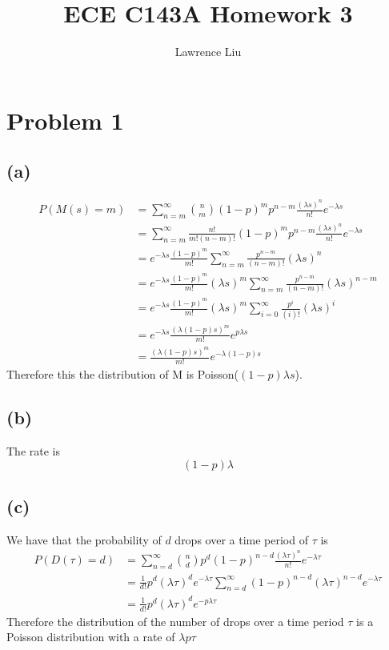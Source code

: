 \documentclass[12pt]{article}
\title{ECE C143A Homework 3}
\author{Lawrence Liu}
\begin{document}
\maketitle
\section*{Problem 1}
\subsection*{(a)}
\begin{align*}
    P(M(s)=m)&=\sum_{n=m}^{\infty}\binom{n}{m}(1-p)^mp^{n-m}\frac{(\lambda s)^n}{n!}e^{-\lambda s}\\
            &=\sum_{n=m}^{\infty}\frac{n!}{m!(n-m)!}(1-p)^mp^{n-m}\frac{(\lambda s)^n}{n!}e^{-\lambda s}\\
            &=e^{-\lambda s}\frac{(1-p)^m}{m!}\sum_{n=m}^{\infty}\frac{p^{n-m}}{(n-m)!}(\lambda s)^n\\
            &=e^{-\lambda s}\frac{(1-p)^m}{m!}(\lambda s)^{m}\sum_{n=m}^{\infty}\frac{p^{n-m}}{(n-m)!}(\lambda s)^{n-m}\\
            &=e^{-\lambda s}\frac{(1-p)^m}{m!}(\lambda s)^{m}\sum_{i=0}^{\infty}\frac{p^{i}}{(i)!}(\lambda s)^{i}\\
            &=e^{-\lambda s}\frac{(\lambda(1-p)s)^m}{m!}e^{p\lambda s}\\
            &=\frac{(\lambda(1-p)s)^m}{m!}e^{-\lambda(1-p)s}
\end{align*}
Therefore this the distribution of M is Poisson($(1-p)\lambda s$).
\subsection*{(b)}
The rate is 
$$(1-p)\lambda$$
\subsection*{(c)}
We have that the probability of $d$ drops over a time period of $\tau$ is 
\begin{align*}
    P(D(\tau)=d)&=\sum_{n=d}^{\infty}\binom{n}{d}p^d(1-p)^{n-d}\frac{(\lambda\tau)^n}{n!}e^{-\lambda \tau}\\
    &=\frac{1}{d!}p^d(\lambda\tau)^de^{-\lambda \tau}\sum_{n=d}^{\infty}(1-p)^{n-d}(\lambda\tau)^{n-d}e^{-\lambda\tau}\\
    &=\frac{1}{d!}p^d(\lambda\tau)^de^{-p\lambda\tau}
\end{align*}
Therefore the distribution of the number of drops over a time period $\tau$ is a Poisson distribution with a rate of $\lambda p \tau$
\end{document}
